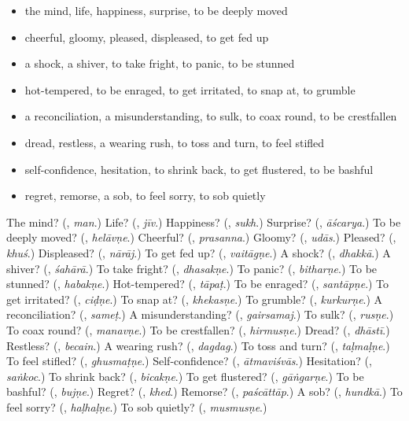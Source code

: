 \begin{itemize}
\raggedright
  \item the mind, life, happiness, surprise, to be deeply moved
  \item cheerful, gloomy, pleased, displeased, to get fed up
  \item a shock, a shiver, to take fright, to panic, to be stunned
  \item hot-tempered, to be enraged, to get irritated, to snap at, to grumble
  \item a reconciliation, a misunderstanding, to sulk, to coax round, to be crestfallen
  \item dread, restless, a wearing rush, to toss and turn, to feel stifled
  \item self-confidence, hesitation, to shrink back, to get flustered, to be bashful
  \item regret, remorse, a sob, to feel sorry, to sob quietly
\end{itemize}

\begin{tcolorbox}[breakable,colback=teal!4,colframe=teal!35!black,title={Before you move on}]
The mind? (\textbf{}, \emph{man}.) Life? (\textbf{}, \emph{jīv}.) Happiness? (\textbf{}, \emph{sukh}.) Surprise? (\textbf{}, \emph{āścarya}.) To be deeply moved? (\textbf{}, \emph{helāvṇe}.) Cheerful? (\textbf{}, \emph{prasanna}.) Gloomy? (\textbf{}, \emph{udās}.) Pleased? (\textbf{}, \emph{khuś}.) Displeased? (\textbf{}, \emph{nārāj}.) To get fed up? (\textbf{}, \emph{vaitāgṇe}.) A shock? (\textbf{}, \emph{dhakkā}.) A shiver? (\textbf{}, \emph{śahārā}.) To take fright? (\textbf{}, \emph{dhasakṇe}.) To panic? (\textbf{}, \emph{bitharṇe}.) To be stunned? (\textbf{}, \emph{habakṇe}.) Hot-tempered? (\textbf{}, \emph{tāpaṭ}.) To be enraged? (\textbf{}, \emph{santāpṇe}.) To get irritated? (\textbf{}, \emph{ciḍṇe}.) To snap at? (\textbf{}, \emph{khekasṇe}.) To grumble? (\textbf{}, \emph{kurkurṇe}.) A reconciliation? (\textbf{}, \emph{sameṭ}.) A misunderstanding? (\textbf{}, \emph{gairsamaj}.) To sulk? (\textbf{}, \emph{rusṇe}.) To coax round? (\textbf{}, \emph{manavṇe}.) To be crestfallen? (\textbf{}, \emph{hirmusṇe}.) Dread? (\textbf{}, \emph{dhāstī}.) Restless? (\textbf{}, \emph{becain}.) A wearing rush? (\textbf{}, \emph{dagdag}.) To toss and turn? (\textbf{}, \emph{taḷmaḷṇe}.) To feel stifled? (\textbf{}, \emph{ghusmaṭṇe}.) Self-confidence? (\textbf{}, \emph{ātmaviśvās}.) Hesitation? (\textbf{}, \emph{saṅkoc}.) To shrink back? (\textbf{}, \emph{bicakṇe}.) To get flustered? (\textbf{}, \emph{gāṅgarṇe}.) To be bashful? (\textbf{}, \emph{bujṇe}.) Regret? (\textbf{}, \emph{khed}.) Remorse? (\textbf{}, \emph{paścāttāp}.) A sob? (\textbf{}, \emph{hundkā}.) To feel sorry? (\textbf{}, \emph{haḷhaḷṇe}.) To sob quietly? (\textbf{}, \emph{musmusṇe}.)
\end{tcolorbox}
